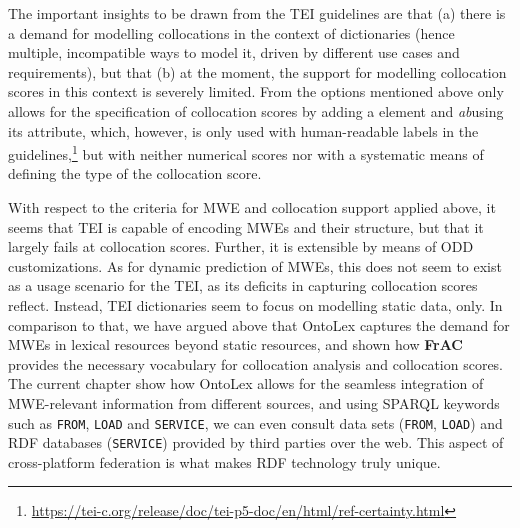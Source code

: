 \documentclass[output=paper,colorlinks,citecolor=brown]{langscibook}
\begin{document}
The important insights to be drawn from the TEI guidelines are that (a) there is a demand for modelling collocations in the context of dictionaries (hence multiple, incompatible ways to model it, driven by different use cases and requirements), but that (b) at the moment, the support for modelling collocation scores in this context is severely limited.
From the options mentioned above only  allows for the specification of collocation scores by adding a  element and \emph{ab}using its  attribute, which, however, is only used with human-readable labels in the guidelines,\footnote{\url{https://tei-c.org/release/doc/tei-p5-doc/en/html/ref-certainty.html}} but with neither numerical scores nor with a systematic means of defining the type of the collocation score.

With respect to the criteria for MWE and collocation support applied above, it seems
that TEI is capable of encoding MWEs and their structure, but that it largely fails at collocation scores.
Further, it is extensible by means of ODD customizations. As for dynamic prediction of MWEs, this does not seem to exist as a usage scenario for the TEI, as its deficits in capturing collocation scores reflect. Instead, TEI dictionaries seem to focus on modelling static data, only.
In comparison to that, we have argued above that OntoLex captures the demand for MWEs in lexical resources beyond static resources, and shown how \textbf{FrAC} provides the necessary vocabulary for collocation analysis and collocation scores. The current chapter show how OntoLex allows for the seamless integration of MWE-relevant information from different sources, and using SPARQL keywords such as \texttt{FROM}, \texttt{LOAD} and \texttt{SERVICE}, we can even consult data sets (\texttt{FROM}, \texttt{LOAD}) and RDF databases (\texttt{SERVICE}) provided by third parties over the web.
This aspect of cross-platform federation is what makes RDF technology truly unique.
\end{document}
